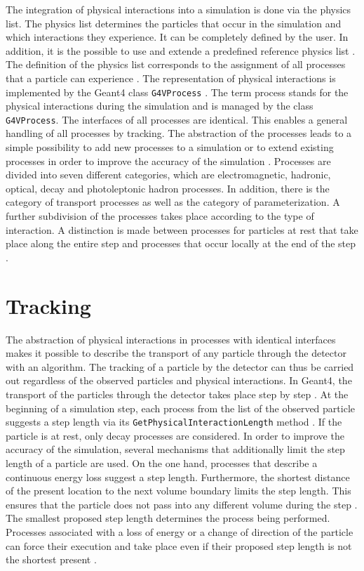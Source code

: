 \documentclass[12pt, a4paper]{thesis}
\begin{document}
The integration of physical interactions into a simulation is done via
the physics list. The physics list determines the particles that occur
in the simulation and which interactions they experience. It can be
completely defined by the user. In addition, it is the possible to use
and extende a predefined reference physics list
\cite{geant4-rec-dev}. The definition of the physics list corresponds
to the assignment of all processes that a particle can experience
\cite{geant_simul_toolk}. The representation of physical interactions
is implemented by the Geant4 class \texttt{G4VProcess}
\cite{geant_simul_toolk}. The term process stands for the physical
interactions during the simulation and is managed by the class
\texttt{G4VProcess}. The interfaces of all processes are
identical. This enables a general handling of all processes by
tracking. The abstraction of the processes leads to a simple
possibility to add new processes to a simulation or to extend existing
processes in order to improve the accuracy of the simulation
\cite{geant4-doc}. Processes are divided into seven different
categories, which are electromagnetic, hadronic, optical, decay and
photoleptonic hadron processes. In addition, there is the category of
transport processes as well as the category of parameterization. A
further subdivision of the processes takes place according to the type
of interaction. A distinction is made between processes for particles
at rest that take place along the entire step and processes that occur
locally at the end of the step \cite{geant_simul_toolk}.

\section{Tracking}
\label{sec:org2ff4601}

The abstraction of physical interactions in processes with identical
interfaces makes it possible to describe the transport of any particle
through the detector with an algorithm. The tracking of a particle by
the detector can thus be carried out regardless of the observed
particles and physical interactions.  In Geant4, the transport of the
particles through the detector takes place step by step
\cite{geant_simul_toolk}.  At the beginning of a simulation step, each
process from the list of the observed particle suggests a step length
via its \texttt{GetPhysicalInteractionLength} method
\cite{geant_simul_toolk}. If the particle is at rest, only decay
processes are considered. In order to improve the accuracy of the
simulation, several mechanisms that additionally limit the step length
of a particle are used. On the one hand, processes that describe a
continuous energy loss suggest a step length. Furthermore, the
shortest distance of the present location to the next volume boundary
limits the step length.  This ensures that the particle does not pass
into any different volume during the step \cite{geant4-rec-dev}. The
smallest proposed step length determines the process being
performed. Processes associated with a loss of energy or a change of
direction of the particle can force their execution and take place
even if their proposed step length is not the shortest present
\cite{geant_simul_toolk}.
\end{document}

